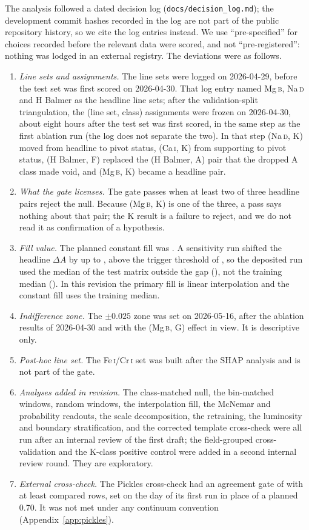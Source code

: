 \documentclass[11pt,a4paper]{article}
\newcommand{\Mgb}{Mg\,\textsc{b}\xspace}
\newcommand{\NaD}{Na\,\textsc{d}\xspace}
\newcommand{\CaI}{Ca\,\textsc{i}\xspace}
\newcommand{\FeCr}{Fe\,\textsc{i}/Cr\,\textsc{i}\xspace}
\newcommand{\dA}{\Delta A}
\begin{document}
The analysis followed a dated decision log (\texttt{docs/decision\_log.md}); the development commit hashes recorded in the log are not part of the public repository history, so we cite the log entries instead. We use ``pre-specified'' for choices recorded before the relevant data were scored, and not ``pre-registered'': nothing was lodged in an external registry. The deviations were as follows.
\begin{enumerate}
\item \emph{Line sets and assignments.} The line sets were logged on 2026-04-29, before the test set was first scored on 2026-04-30. That log entry named \Mgb, \NaD and H Balmer as the headline line sets; after the validation-split triangulation, the (line set, class) assignments were frozen on 2026-04-30, about eight hours after the test set was first scored, in the same step as the first ablation run (the log does not separate the two). In that step (\NaD, K) moved from headline to pivot status, (\CaI, K) from supporting to pivot status, (H Balmer, F) replaced the (H Balmer, A) pair that the dropped A class made void, and (\Mgb, K) became a headline pair.
\item \emph{What the gate licenses.} The gate passes when at least two of three headline pairs reject the null. Because (\Mgb, K) is one of the three, a pass says nothing about that pair; the K result is a failure to reject, and we do not read it as confirmation of a hypothesis.
\item \emph{Fill value.} The planned constant fill was \fillLocked. A sensitivity run shifted the headline $\dA$ by up to \fillMaxShift, above the trigger threshold of \fillTrigger, so the deposited run used the median of the test matrix outside the gap (\fillEmpirical), not the training median (\sdMedTrainGlobal). In this revision the primary fill is linear interpolation and the constant fill uses the training median.
\item \emph{Indifference zone.} The $\pm 0.025$ zone was set on 2026-05-16, after the ablation results of 2026-04-30 and with the (\Mgb, G) effect in view. It is descriptive only.
\item \emph{Post-hoc line set.} The \FeCr set was built after the SHAP analysis and is not part of the gate.
\item \emph{Analyses added in revision.} The class-matched null, the bin-matched windows, \ablNControls{} random windows, the interpolation fill, the McNemar and probability readouts, the scale decomposition, the retraining, the luminosity and boundary stratification, and the corrected template cross-check were all run after an internal review of the first draft; the field-grouped cross-validation and the K-class positive control were added in a second internal review round. They are exploratory.
\item \emph{External cross-check.} The Pickles cross-check had an agreement gate of \pkGate{} with at least \pkGateMinN{} compared rows, set on the day of its first run in place of a planned 0.70. It was not met under any continuum convention (Appendix~\ref{app:pickles}).
\end{enumerate}
\end{document}
